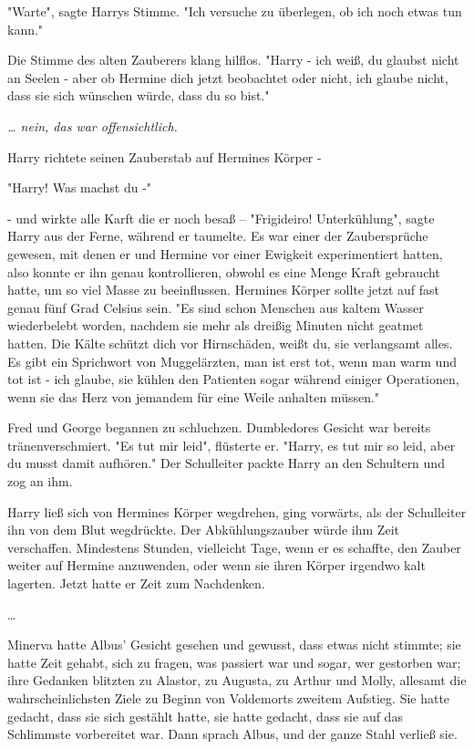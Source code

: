 {"Warte", sagte Harrys Stimme. "Ich versuche zu überlegen, ob ich noch etwas tun kann."

Die Stimme des alten Zauberers klang hilflos. "Harry - ich weiß, du glaubst nicht an Seelen - aber ob Hermine dich jetzt beobachtet oder nicht, ich glaube nicht, dass sie sich wünschen würde, dass du so bist."

\emph{… nein, das war offensichtlich.}

Harry richtete seinen Zauberstab auf Hermines Körper -

"Harry! Was machst du -"

- und wirkte alle Karft die er noch besaß -- "Frigideiro! Unterkühlung", sagte Harry aus der Ferne, während er taumelte. Es war einer der Zaubersprüche gewesen, mit denen er und Hermine vor einer Ewigkeit experimentiert hatten, also konnte er ihn genau kontrollieren, obwohl es eine Menge Kraft gebraucht hatte, um so viel Masse zu beeinflussen. Hermines Körper sollte jetzt auf fast genau fünf Grad Celsius sein. "Es sind schon Menschen aus kaltem Wasser wiederbelebt worden, nachdem sie mehr als dreißig Minuten nicht geatmet hatten. Die Kälte schützt dich vor Hirnschäden, weißt du, sie verlangsamt alles. Es gibt ein Sprichwort von Muggelärzten, man ist erst tot, wenn man warm und tot ist - ich glaube, sie kühlen den Patienten sogar während einiger Operationen, wenn sie das Herz von jemandem für eine Weile anhalten müssen."

Fred und George begannen zu schluchzen. Dumbledores Gesicht war bereits tränenverschmiert. "Es tut mir leid", flüsterte er. "Harry, es tut mir so leid, aber du musst damit aufhören." Der Schulleiter packte Harry an den Schultern und zog an ihm.

Harry ließ sich von Hermines Körper wegdrehen, ging vorwärts, als der Schulleiter ihn von dem Blut wegdrückte. Der Abkühlungszauber würde ihm Zeit verschaffen. Mindestens Stunden, vielleicht Tage, wenn er es schaffte, den Zauber weiter auf Hermine anzuwenden, oder wenn sie ihren Körper irgendwo kalt lagerten. Jetzt hatte er Zeit zum Nachdenken.

…

Minerva hatte Albus' Gesicht gesehen und gewusst, dass etwas nicht stimmte; sie hatte Zeit gehabt, sich zu fragen, was passiert war und sogar, wer gestorben war; ihre Gedanken blitzten zu Alastor, zu Augusta, zu Arthur und Molly, allesamt die wahrscheinlichsten Ziele zu Beginn von Voldemorts zweitem Aufstieg. Sie hatte gedacht, dass sie sich gestählt hatte, sie hatte gedacht, dass sie auf das Schlimmste vorbereitet war. Dann sprach Albus, und der ganze Stahl verließ sie.

}
